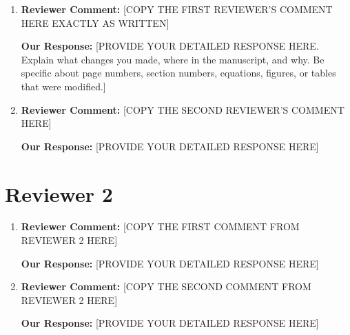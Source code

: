 \documentclass[12pt]{article}
\begin{document}
\begin{enumerate}

\item \textbf{Reviewer Comment:} [COPY THE FIRST REVIEWER'S COMMENT HERE EXACTLY AS WRITTEN]

\textbf{Our Response:} {\color{blue}[PROVIDE YOUR DETAILED RESPONSE HERE. Explain what changes you made, where in the manuscript, and why. Be specific about page numbers, section numbers, equations, figures, or tables that were modified.]}

\item \textbf{Reviewer Comment:} [COPY THE SECOND REVIEWER'S COMMENT HERE]

\textbf{Our Response:} {\color{blue}[PROVIDE YOUR DETAILED RESPONSE HERE]}


\end{enumerate}


\section*{Reviewer 2}

\begin{enumerate}

\item \textbf{Reviewer Comment:} [COPY THE FIRST COMMENT FROM REVIEWER 2 HERE]

\textbf{Our Response:} {\color{blue}[PROVIDE YOUR DETAILED RESPONSE HERE]}

\item \textbf{Reviewer Comment:} [COPY THE SECOND COMMENT FROM REVIEWER 2 HERE]

\textbf{Our Response:} {\color{blue}[PROVIDE YOUR DETAILED RESPONSE HERE]}


\end{enumerate}
\end{document}
